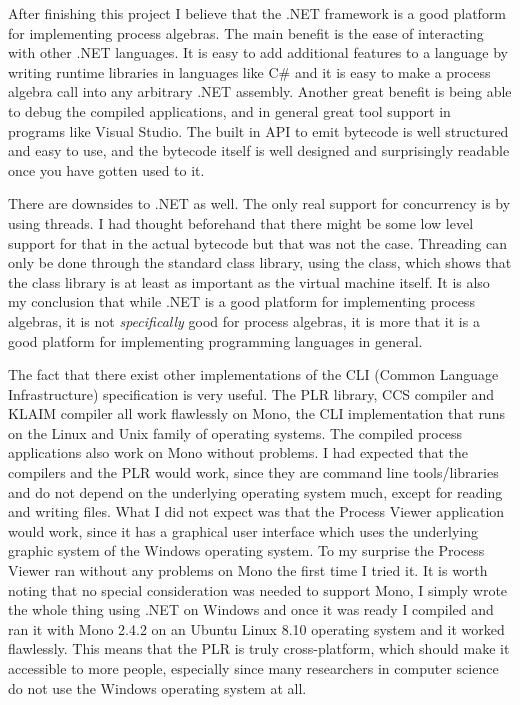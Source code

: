 	After finishing this project I believe that the .NET framework is a
	good platform for implementing process algebras. The main benefit is the 
	ease of interacting with other .NET languages. It is easy to add additional 
	features to a language by writing runtime libraries in languages like C\# 
	and it is easy to make a process algebra call into any arbitrary .NET 
	assembly. Another great benefit is being able to debug the compiled 
	applications, and in general great tool support in programs like Visual 
	Studio. The built in API to emit bytecode is well structured and easy to 
	use, and the bytecode itself is well designed and surprisingly readable once 
	you have gotten used to it. 
	
	There are downsides to .NET as well. The only real support for concurrency 
	is by using threads. I had thought beforehand that there might be some low 
	level support for that in the actual bytecode but that was not the case. 
	Threading can only be done through the standard class library, using the 
	 class, which shows that the class library is at least as 
	important as the virtual machine itself. It is also my conclusion that while
	.NET is a good platform for implementing process algebras, it is not 
	\textit{specifically} good for process algebras, it is more that it is a 
	good platform for implementing programming languages in general. 

	The fact that there exist other implementations of the CLI (Common Language 
	Infrastructure) specification is very useful. The PLR library, CCS compiler 
	and KLAIM compiler all work flawlessly on Mono, the CLI implementation that 
	runs on the Linux and Unix family of operating systems. The compiled process 
	applications also work on Mono without problems. I had expected that the 
	compilers and the PLR would work, since they are command line tools/libraries
	and do not depend on the underlying operating system much, except for reading
	and writing files. What I did not expect was that the Process Viewer 
	application would work, since it has a graphical user interface which uses
	the underlying graphic system of the Windows operating system. To my surprise
	the Process Viewer ran without any problems on Mono the first time I tried 
	it. It is worth noting that no special consideration was needed to support 
	Mono, I simply wrote the whole thing using .NET on Windows and once it was 
	ready I compiled and ran it with Mono 2.4.2 on an Ubuntu Linux 8.10 
	operating system and it worked flawlessly. This means that the PLR is truly 
	cross-platform, which should make it accessible to more people, especially 
	since many researchers in computer science do not use the Windows operating 
	system at all. 

